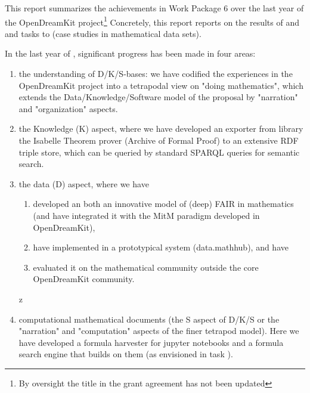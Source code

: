 This report summarizes the achievements in Work Package 6 over the last year of the OpenDreamKit project\footnote{By oversight the title in the grant agreement has not been updated} Concretely, this report reports on the results of  and  and tasks  to  (case studies in mathematical data sets).

In the last year of \pn, significant progress has been made in four areas:
\begin{enumerate}
\item the understanding of D/K/S-bases: we have codified the experiences in the OpenDreamKit project into a tetrapodal view on "doing mathematics", which extends the Data/Knowledge/Software model of the proposal by "narration" and "organization" aspects.
\item the Knowledge (K) aspect, where we have developed an exporter from library the Isabelle Theorem prover (Archive of Formal Proof) to an extensive RDF triple store, which can be queried by standard SPARQL queries for semantic search. \item the data (D) aspect, where we have
  \begin{enumerate}
  \item developed an both an innovative model of (deep) FAIR in mathematics (and have integrated it with the MitM paradigm developed in OpenDreamKit),
  \item have implemented in a prototypical system (data.mathhub), and have
  \item evaluated it on the mathematical community outside the core OpenDreamKit community.
  \end{enumerate}z
\item computational mathematical documents (the S aspect of D/K/S or the "narration" and "computation" aspects of the finer tetrapod model). Here we have developed a formula harvester for jupyter notebooks and a formula search engine that builds on them (as envisioned in task ).
\end{enumerate}

